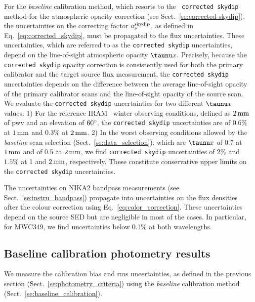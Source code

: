 {For the \emph{baseline} calibration method, which resorts to the {\tt
corrected skydip} method for the atmospheric opacity correction (see
Sect.~\ref{se:corrected-skydip}), the uncertainties on the
correcting factor $a_\nu^{\rm{skydip}}$, as defined in
Eq.~\ref{eq:corrected_skydip}, must be propagated to the flux
uncertainties. These uncertainties, which are referred to as the
{\tt corrected skydip} uncertainties, depend on the line-of-sight atmospheric
opacity $\taunu x$. Precisely, because the {\tt corrected skydip}
opacity correction is consistently used for both the primary
calibrator and the target source flux measurement, the {\tt corrected skydip}
uncertainties depends on the difference between the average
line-of-sight opacity of the primary calibrator scans and the
line-of-sight opacity of the source scan.   
We evaluate the {\tt corrected skydip} uncertainties for two
different $\taunu x$ values. 1) For the reference IRAM \trentemetre\
winter observing conditions, defined as $2\,\rm{mm}$ of pwv and an
elevation of $60^{\rm{o}}$, the {\tt corrected skydip} uncertainties are of
0.6\% at $1\,\rm{mm}$ and 0.3\% at $2\,\rm{mm}$. 2) In the worst
observing conditions allowed by the \emph{baseline} scan selection
(Sect.~\ref{se:data_selection}),
which are $\taunu x$ of 0.7 at $1\,\rm{mm}$ and of 0.5 at
$2\,\rm{mm}$, we find {\tt corrected skydip} uncertainties of 2\% and
$1.5\%$ at 1 and $2\,\rm{mm}$, respectively. These constitute
conservative upper limits on the {\tt corrected skydip}
uncertainties.

The uncertainties on NIKA2 bandpass measurements (see
Sect.~\ref{se:instru_bandpass}) propagate into
uncertainties on the flux densities after the colour correction using
Eq.~\ref{eq:color_correction}. These
uncertainties depend on the source SED but are negligible in most of
the cases. In particular, for MWC349, we find uncertainties below 0.1\% at
both wavelengths.}




\subsection{Baseline calibration photometry results}
\label{se:photometry_baseline}

We measure the calibration bias and rms uncertainties, as defined
in the previous section (Sect.~\ref{se:photometry_criteria}) using the
\emph{baseline} calibration method (Sect.~\ref{se:baseline_calibration}).


